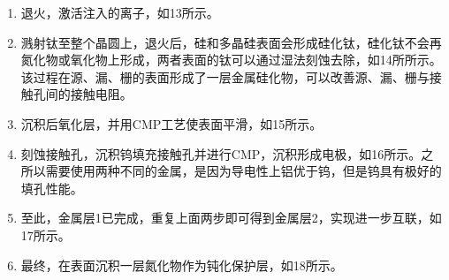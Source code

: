 \begin{enumerate}
    \item 退火，激活注入的离子，如13所示。
    \item 溅射钛至整个晶圆上，退火后，硅和多晶硅表面会形成硅化钛，硅化钛不会再氮化物或氧化物上形成，两者表面的钛可以通过湿法刻蚀去除，如14所所示。该过程在源、漏、栅的表面形成了一层金属硅化物，可以改善源、漏、栅与接触孔间的接触电阻。
    \item 沉积后氧化层，并用CMP工艺使表面平滑，如15所示。
    \item 刻蚀接触孔，沉积钨填充接触孔并进行CMP，沉积形成电极，如16所示。之所以需要使用两种不同的金属，是因为导电性上铝优于钨，但是钨具有极好的填孔性能。
    \item 至此，金属层1已完成，重复上面两步即可得到金属层2，实现进一步互联，如17所示。
    \item 最终，在表面沉积一层氮化物作为钝化保护层，如18所示。
\end{enumerate}